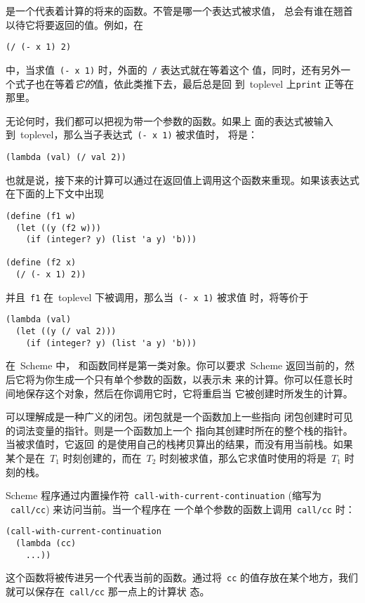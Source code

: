 \continuation{}是一个代表着计算的将来的函数。不管是哪一个表达式被求值，
总会有谁在翘首以待它将要返回的值。例如，在
\begin{lstlisting}
(/ (- x 1) 2)
\end{lstlisting}
中，当求值~\verb|(- x 1)| 时，外面的~\verb|/| 表达式就在等着这个
值，同时，还有另外一个式子也在等着\emph{它的}值，依此类推下去，最后总是回
到~toplevel 上\pozhehao{}\verb|print| 正等在那里。

无论何时，我们都可以把\continuation{}视为带一个参数的函数。如果上
面的表达式被输入到~toplevel，那么当子表达式~\verb|(- x 1)| 被求值时，
\continuation{} 将是：
\begin{lstlisting}
(lambda (val) (/ val 2))
\end{lstlisting}
也就是说，接下来的计算可以通过在返回值上调用这个函数来重现。如果该表达式
在下面的上下文中出现
\begin{lstlisting}
(define (f1 w)
  (let ((y (f2 w)))
    (if (integer? y) (list 'a y) 'b)))

(define (f2 x)
  (/ (- x 1) 2))
\end{lstlisting}
并且~\texttt{f1} 在~toplevel 下被调用，那么当~\texttt{(- x 1)} 被求值
时，\continuation{}将等价于
\begin{lstlisting}
(lambda (val)
  (let ((y (/ val 2)))
    (if (integer? y) (list 'a y) 'b)))
\end{lstlisting}

在~Scheme 中，\continuation{} 和函数同样是第一类对象。你可以要求~Scheme
返回当前的\continuation{}，然后它将为你生成一个只有单个参数的函数，以表示未
来的计算。你可以任意长时间地保存这个对象，然后在你调用它时，它将重启当
它被创建时所发生的计算。

\continuation{}可以理解成是一种广义的闭包。闭包就是一个函数加上一些指向
闭包创建时可见的词法变量的指针。\continuation{}则是一个函数加上一个
指向其创建时所在的整个栈的指针。当\continuation{}被求值时，它返回
的是使用自己的栈拷贝算出的结果，而没有用当前栈。如果某个\continuation{}是在~$T_1$
时刻创建的，而在~$T_2$ 时刻被求值，那么它求值时使用的将是~$T_1$ 时刻的栈。

Scheme 程序通过内置操作符~\verb|call-with-current-continuation| (缩写为
~\verb|call/cc|)
来访问当前\continuation{}。当一个程序在
一个单个参数的函数上调用~\texttt{call/cc} 时：
\begin{lstlisting}
(call-with-current-continuation
  (lambda (cc)
    ...))
\end{lstlisting}
这个函数将被传进另一个代表当前\continuation{}的函数。通过将~\texttt{cc}
的值存放在某个地方，我们就可以保存在~\texttt{call/cc} 那一点上的计算状
态。

